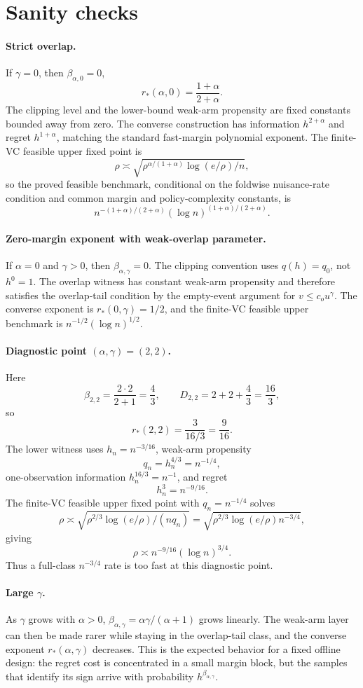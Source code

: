 \documentclass[11pt]{article}
\theoremstyle{definition}
\theoremstyle{plain}
\theoremstyle{remark}
\begin{document}
\section{Sanity checks}
\paragraph{Strict overlap.}
If \(\gamma=0\), then \(\beta_{\alpha,0}=0\),
\[
r_*(\alpha,0)=\frac{1+\alpha}{2+\alpha}.
\]
The clipping level and the lower-bound weak-arm propensity are fixed
constants bounded away from zero.  The converse construction has information
\(h^{2+\alpha}\) and regret \(h^{1+\alpha}\), matching the standard
fast-margin polynomial exponent.  The finite-VC feasible upper fixed point is
\[
\rho\asymp
\sqrt{\rho^{\alpha/(1+\alpha)}\log(e/\rho)/n},
\]
so the proved feasible benchmark, conditional on the foldwise nuisance-rate
condition and common margin and policy-complexity constants, is
\[
n^{-(1+\alpha)/(2+\alpha)}
(\log n)^{(1+\alpha)/(2+\alpha)}.
\]

\paragraph{Zero-margin exponent with weak-overlap parameter.}
If \(\alpha=0\) and \(\gamma>0\), then
\(\beta_{\alpha,\gamma}=0\).  The clipping convention uses \(q(h)=q_0\),
not \(h^0=1\).  The overlap witness has constant weak-arm propensity and
therefore satisfies the overlap-tail condition by the empty-event argument
for \(v\le c_o u^\gamma\).  The converse exponent is
\(r_*(0,\gamma)=1/2\), and the finite-VC feasible upper benchmark is
\(n^{-1/2}(\log n)^{1/2}\).

\paragraph{Diagnostic point \((\alpha,\gamma)=(2,2)\).}
Here
\[
\beta_{2,2}=\frac{2\cdot2}{2+1}=\frac43,\qquad
D_{2,2}=2+2+\frac43=\frac{16}{3},
\]
so
\[
r_*(2,2)=\frac3{16/3}=\frac9{16}.
\]
The lower witness uses \(h_n=n^{-3/16}\), weak-arm propensity
\[
q_n=h_n^{4/3}=n^{-1/4},
\]
one-observation information \(h_n^{16/3}=n^{-1}\), and regret
\[
h_n^3=n^{-9/16}.
\]
The finite-VC feasible upper fixed point with \(q_n=n^{-1/4}\) solves
\[
\rho\asymp\sqrt{\rho^{2/3}\log(e/\rho)/(nq_n)}
=\sqrt{\rho^{2/3}\log(e/\rho)n^{-3/4}},
\]
giving
\[
\rho\asymp n^{-9/16}(\log n)^{3/4}.
\]
Thus a full-class \(n^{-3/4}\) rate is too fast at this diagnostic point.

\paragraph{Large \(\gamma\).}
As \(\gamma\) grows with \(\alpha>0\),
\(\beta_{\alpha,\gamma}=\alpha\gamma/(\alpha+1)\) grows linearly.  The
weak-arm layer can then be made rarer while staying in the overlap-tail
class, and the converse exponent \(r_*(\alpha,\gamma)\) decreases.  This is
the expected behavior for a fixed offline design: the regret cost is
concentrated in a small margin block, but the samples that identify its sign
arrive with probability \(h^{\beta_{\alpha,\gamma}}\).
\end{document}
